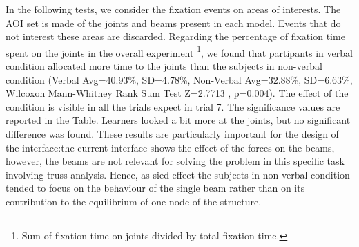 \documentclass{article}
\begin{document}
In the following tests, we consider the fixation events on areas of interests. The AOI set is made of the joints and beams present in each model. Events that do not interest these areas are discarded. 
Regarding the percentage of fixation time spent on the joints in the overall experiment \footnote{Sum of fixation time on joints divided by total fixation time.}, we found that partipants in verbal condition allocated more time to the joints than the subjects in non-verbal condition (Verbal Avg=40.93\%, SD=4.78\%, Non-Verbal Avg=32.88\%, SD=6.63\%,  Wilcoxon Mann-Whitney Rank Sum Test Z=2.7713 , p=0.004). The effect of the condition is visible in all the trials expect in trial 7. The significance values are reported in the Table.
Learners looked a bit more at the joints, but no significant difference was found.
These results are particularly important for the design of the interface:the current interface shows the effect of the forces on the beams, however, the beams are not relevant for solving the problem in this specific task involving truss analysis. Hence, as sied effect the subjects in non-verbal condition tended to focus on the behaviour of the single beam rather than on its contribution to the equilibrium of one node of the structure.  
\end{document}
